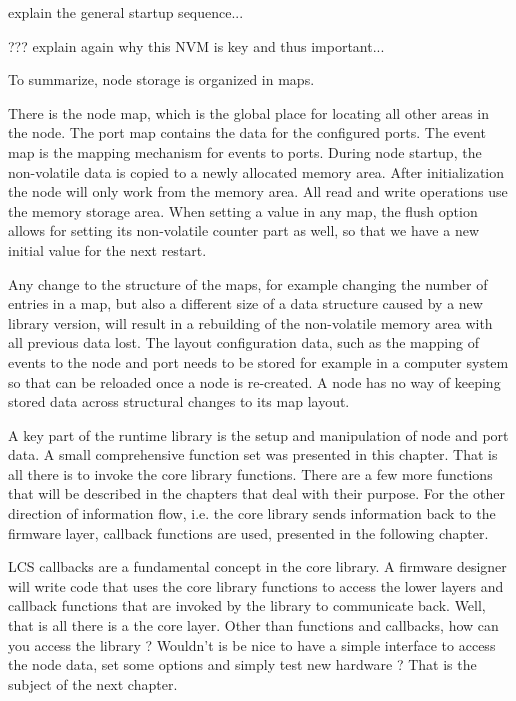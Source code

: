 

 explain the general startup sequence...



??? explain again why this NVM is key and thus important...

To summarize, node storage is organized in maps. 

There is the node map, which is the global place for locating all other areas in the node. The port map contains the data for the configured ports. The event map is the mapping mechanism for events to ports. During node startup, the non-volatile data is copied to a newly allocated memory area. After initialization the node will only work from the memory area. All read and write operations use the memory storage area. When setting a value in any map, the flush option allows for setting its non-volatile counter part as well, so that we have a new initial value for the next restart.

Any change to the structure of the maps, for example changing the number of entries in a map, but also a different size of a data structure caused by a new library version, will result in a rebuilding of the non-volatile memory area with all previous data lost. The layout configuration data, such as the mapping of events to the node and port needs to be stored for example in a computer system so that can be reloaded once a node is re-created. A node has no way of keeping stored data across structural changes to its map layout.

A key part of the runtime library is the setup and manipulation of node and port data. A small comprehensive function set was presented in this chapter. That is all there is to invoke the core library functions. There are a few more functions that will be described in the chapters that deal with their purpose. For the other direction of information flow, i.e. the core library sends information back to the firmware layer, callback functions are used, presented in the following chapter.

LCS callbacks are a fundamental concept in the core library. A firmware designer will write code that uses the core library functions to access the lower layers and callback functions that are invoked by the library to communicate back. Well, that is all there is a the core layer. Other than functions and callbacks, how can you access the library ? Wouldn't is be nice to have a simple interface to access the node data, set some options and simply test new hardware ? That is the subject of the next chapter.



